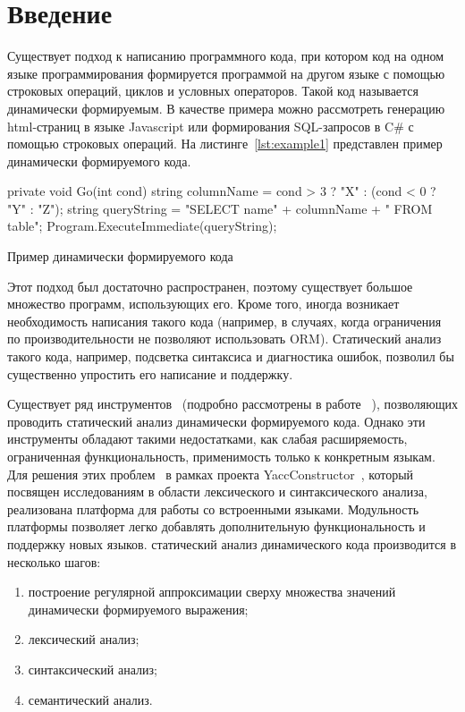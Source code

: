 \section*{Введение}
Существует подход к написанию программного кода, при котором код на одном языке программирования формируется программой на другом языке с помощью строковых операций, циклов и условных операторов. Такой код называется динамически формируемым. В качестве примера можно рассмотреть генерацию html-страниц в языке Javascript или формирования SQL-запросов в C\# с помощью строковых операций. На листинге~\ref{lst:example1} представлен пример динамически формируемого кода.

\begin{listing}[H]
    \begin{pyglist}[language=csharp,numbers=left,numbersep=5pt]
 private void Go(int cond){
   string columnName = cond > 3 ? "X" : (cond < 0 ? "Y" : "Z");
   string queryString = 
       "SELECT name" + columnName + " FROM table";
   Program.ExecuteImmediate(queryString);}
    \end{pyglist}
\caption{Пример динамически формируемого кода}
\label{lst:example1}
\end{listing}

Этот подход был достаточно распространен, поэтому существует большое множество программ, использующих его. Кроме того, иногда возникает необходимость написания такого кода (например, в случаях, когда ограничения по производительности не позволяют использовать ORM). Статический анализ такого кода, например, подсветка синтаксиса и диагностика ошибок, позволил бы существенно упростить его написание и поддержку.

Существует ряд инструментов~\cite{Alvor, JSA, PHPSA} (подробно рассмотрены в работе ~\cite{polubelova}), позволяющих проводить статический анализ динамически формируемого кода. Однако эти инструменты обладают такими недостатками, как слабая расширяемость, ограниченная функциональность, применимость только к конкретным языкам. Для решения этих проблем~\cite{GrigorievPhd} в рамках проекта YaccConstructor~\cite{YCUrl, articleYC}, который посвящен исследованиям в области лексического и синтаксического анализа, реализована платформа для работы со встроенными языками. Модульность платформы позволяет легко добавлять дополнительную функциональность и поддержку новых языков. статический анализ динамического кода производится в несколько шагов: 
\begin{enumerate}
\item построение регулярной аппроксимации сверху множества значений динамически формируемого выражения;
\item лексический анализ;
\item синтаксический анализ;
\item семантический анализ.
\end{enumerate}

